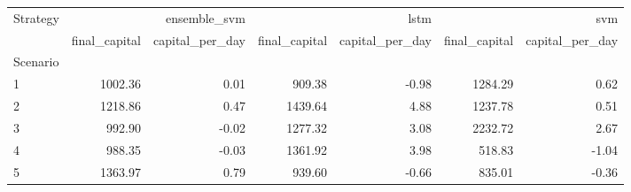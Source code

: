 \begin{tabular}{lrrrrrr}
\toprule
Strategy & \multicolumn{2}{r}{ensemble_svm} & \multicolumn{2}{r}{lstm} & \multicolumn{2}{r}{svm} \\
 & final_capital & capital_per_day & final_capital & capital_per_day & final_capital & capital_per_day \\
Scenario &  &  &  &  &  &  \\
\midrule
1 & 1002.36 & 0.01 & 909.38 & -0.98 & 1284.29 & 0.62 \\
2 & 1218.86 & 0.47 & 1439.64 & 4.88 & 1237.78 & 0.51 \\
3 & 992.90 & -0.02 & 1277.32 & 3.08 & 2232.72 & 2.67 \\
4 & 988.35 & -0.03 & 1361.92 & 3.98 & 518.83 & -1.04 \\
5 & 1363.97 & 0.79 & 939.60 & -0.66 & 835.01 & -0.36 \\
\bottomrule
\end{tabular}
